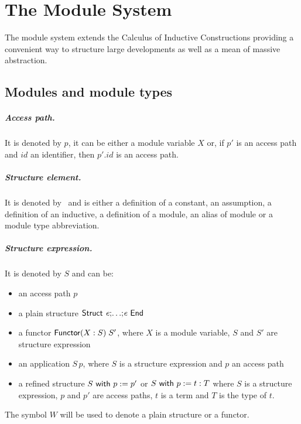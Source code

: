 \chapter[The Module System]{The Module System\label{chapter:Modules}}

The module system extends the Calculus of Inductive Constructions
providing a convenient way to structure large developments as well as
a mean of massive abstraction.

\section{Modules and module types}

\paragraph{Access path.} It is denoted by $p$, it can be either a module 
variable $X$ or, if $p'$ is an access path and $id$ an identifier, then
$p'.id$ is an access path.

\paragraph{Structure element.} It is denoted by \elem\ and is either a
definition of a constant, an assumption, a definition of an inductive,
 a definition of a module, an alias of module or a module type abbreviation.

\paragraph{Structure expression.} It is denoted by $S$ and can be:
\begin{itemize}
\item an access path $p$
\item a plain structure ${\sf Struct}~{{\it e}} {\tt ;} {\ldots} {\tt ;} {{\it e}}~{\sf End}$
\item a functor ${\sf Functor}(X:S)\;S'$, where $X$ is a module variable,
  $S$ and $S'$ are structure expression
\item an application $S\,p$, where $S$ is a structure expression and $p$ 
an access path 
\item a refined structure $S~{\sf with}~p := p'$ or $S~{\sf with}~p := t:T$ where $S$
is a structure expression, $p$ and $p'$ are access paths, $t$ is a term 
and $T$ is the type of $t$.
\end{itemize}
The symbol $W$ will be used to denote a plain structure or a functor.
